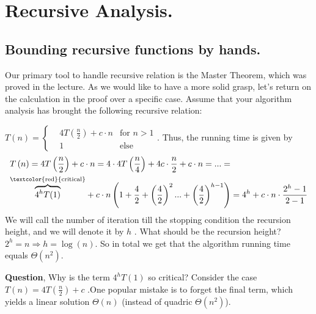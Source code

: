\setcounter{chapter}{2}
\chapter{Recursive Analysis.} 
% 
%

\section{Bounding recursive functions by hands.} Our primary tool to handle recursive relation is the Master Theorem, which was proved in the lecture. As we would like to have a more solid grasp, let's return on the calculation in the proof over a specific case. 
Assume that your algorithm analysis has brought the following recursive relation:
    \begin{example}\( T\left(n\right)  = \left\{ \begin{array}{rcl}
& 4T\left(\frac{n}{2}\right)+c\cdot n & \mbox{for }  n > 1  \\
& 1 & \mbox{else}  
\end{array}\right. \). Thus, the running time is given by \begin{equation*}
    \begin{split}
 & T\left(n\right)  = 4T\left(\frac{n}{2}\right)+c\cdot n=  4\cdot4T\left(\frac{n}{4}\right)+4c\cdot\frac{n}{2}+c\cdot n = ... = \\ & \overset{\text{\textcolor{red}{critical}}}{\overbrace{4^{h}T(1)}} + c\cdot n\left(1+\frac{4}{2}+\left(\frac{4}{2}\right)^{2}...+\left(\frac{4}{2}\right)^{h-1}\right) = 4^{h} + c\cdot n\cdot\frac{2^{h}-1}{2-1}
    \end{split}
\end{equation*}
We will call the number of iteration till the stopping condition the recursion height, and we will denote it by \(h\) . What should be the recursion height? \( 2^{h} = n \Rightarrow h =\log\left(n\right) \). So in total we get that the algorithm running time equals \( \Theta\left(n^2\right)\). 
\end{example}
\textbf{Question}, Why is the term \( 4^{h} T(1) \) so critical? Consider the case \(T\left(n\right) =  4T\left(\frac{n}{2}\right) + c \) .One popular mistake is to forget the final term, which yields a linear solution \( \Theta(n)\) (instead of quadric \( \Theta(n^2)\)).   

